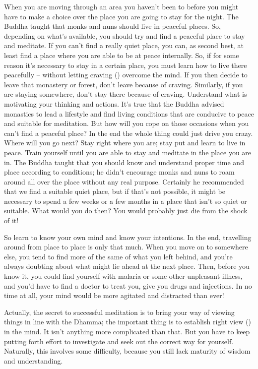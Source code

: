 When you are moving through an area you haven't been to before you might have to make a choice over the place you are going to stay for the night. The Buddha taught that monks and nuns should live in peaceful places. So, depending on what's available, you should try and find a peaceful place to stay and meditate. If you can't find a really quiet place, you can, as second best, at least find a place where you are able to be at peace internally. So, if for some reason it's necessary to stay in a certain place, you must learn how to live there peacefully -- without letting craving () overcome the mind. If you then decide to leave that monastery or forest, don't leave because of craving. Similarly, if you are staying somewhere, don't stay there because of craving. Understand what is motivating your thinking and actions. It's true that the Buddha advised monastics to lead a lifestyle and find living conditions that are conducive to peace and suitable for meditation. But how will you cope on those occasions when you can't find a peaceful place? In the end the whole thing could just drive you crazy. Where will you go next? Stay right where you are; stay put and learn to live in peace. Train yourself until you are able to stay and meditate in the place you are in. The Buddha taught that you should know and understand proper time and place according to conditions; he didn't encourage monks and nuns to roam around all over the place without any real purpose. Certainly he recommended that we find a suitable quiet place, but if that's not possible, it might be necessary to spend a few weeks or a few months in a place that isn't so quiet or suitable. What would you do then? You would probably just die from the shock of it!

So learn to know your own mind and know your intentions. In the end, travelling around from place to place is only that much. When you move on to somewhere else, you tend to find more of the same of what you left behind, and you're always doubting about what might lie ahead at the next place. Then, before you know it, you could find yourself with malaria or some other unpleasant illness, and you'd have to find a doctor to treat you, give you drugs and injections. In no time at all, your mind would be more agitated and distracted than ever!

Actually, the secret to successful meditation is to bring your way of viewing things in line with the Dhamma; the important thing is to establish right view () in the mind. It isn't anything more complicated than that. But you have to keep putting forth effort to investigate and seek out the correct way for yourself. Naturally, this involves some difficulty, because you still lack maturity of wisdom and understanding.

